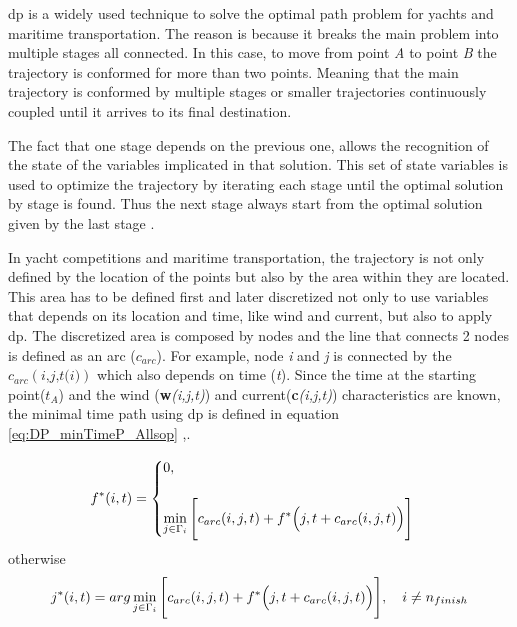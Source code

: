 \acrshort{dp} is a widely used technique to solve the optimal path problem for yachts and maritime transportation. The reason is because it breaks the main problem into multiple stages all connected. In this case, to move from point \textit{A} to point \textit{B} the trajectory is conformed for more than two points. Meaning that the main trajectory is conformed by multiple stages or smaller trajectories continuously coupled until it arrives to its final destination. \par \noindent 
The fact that one stage depends on the previous one, allows the recognition of the state of the variables implicated in that solution. This set of state variables is used to optimize the trajectory by iterating each stage until the optimal solution by stage is found. Thus the next stage always start from the optimal solution given by the last stage \cite{philpott2001optimising}. \par

In yacht competitions and maritime transportation, the trajectory is not only defined by the location of the points but also by the area within they are located. This area has to be defined first and later discretized not only to use variables that depends on its location and time, like wind and current, but also to apply \acrshort{dp}. The discretized area is composed by nodes and the line that connects 2 nodes is defined as an arc ($c_{arc}$). For example, node \textit{i} and \textit{j} is connected by the $c_{arc}(\textit{i,j,t(i)})$ which also depends on time (\textit{t}). Since the time at the starting point(\textit{$t_{A}$}) and the wind (\textbf{w}\textit{(i,j,t)}) and current(\textbf{c}\textit{(i,j,t)})  characteristics are known, the minimal time path using \acrshort{dp} is defined in equation \ref{eq:DP_minTimeP_Allsop}  \cite{zyczkowski2017method},\cite{allsopp2000optimal}.

\begin{equation} \label{eq:DP_minTimeP_Allsop}
f^*(i,t)=
\begin{cases}
0,  &  \\
\\
\noindent 
\displaystyle
\min_{j \in \Gamma_{i}} \Bigg[c_{arc}(i,j,t)+f^*\Big(j,t + c_{arc}(i,j,t)\Big) \Bigg]\\
\end{cases}
\end{equation}
\hspace{20mm} otherwise
\begin{equation}
j^*(i,t)=
\noindent 
\displaystyle
arg \min_{j \in \Gamma_{i}} \Bigg[ c_{arc}(i,j,t)+f^*\Big(j,t + c_{arc}(i,j,t)\Big) \Bigg], \quad i \neq n_{finish} 
\end{equation}

